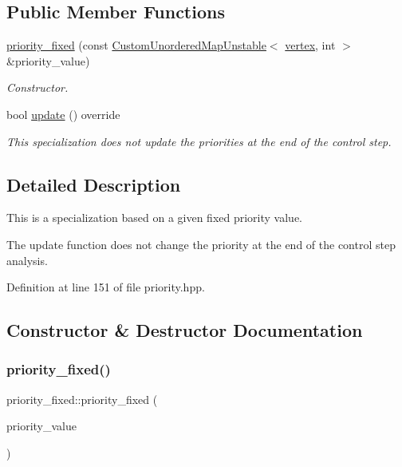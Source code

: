 \subsection*{Public Member Functions}
\begin{DoxyCompactItemize}
\item 
\hyperlink{structpriority__fixed_a5d59aa8f3a1e06e94a70e705db5f37f7}{priority\+\_\+fixed} (const \hyperlink{custom__map_8hpp_a8cbaceffc09790a885ec7e9c17809c69}{Custom\+Unordered\+Map\+Unstable}$<$ \hyperlink{graph_8hpp_abefdcf0544e601805af44eca032cca14}{vertex}, int $>$ \&priority\+\_\+value)
\begin{DoxyCompactList}\small\item\em Constructor. \end{DoxyCompactList}\item 
bool \hyperlink{structpriority__fixed_ad7f69dcb5974fda7d05af656dbaee1c7}{update} () override
\begin{DoxyCompactList}\small\item\em This specialization does not update the priorities at the end of the control step. \end{DoxyCompactList}\end{DoxyCompactItemize}


\subsection{Detailed Description}
This is a specialization based on a given fixed priority value. 

The update function does not change the priority at the end of the control step analysis. 

Definition at line 151 of file priority.\+hpp.



\subsection{Constructor \& Destructor Documentation}
\mbox{\label{structpriority__fixed_a5d59aa8f3a1e06e94a70e705db5f37f7}} 
\subsubsection{\texorpdfstring{priority\+\_\+fixed()}{priority\_fixed()}}
{\footnotesize\ttfamily priority\+\_\+fixed\+::priority\+\_\+fixed (\begin{DoxyParamCaption}\item[{const \hyperlink{custom__map_8hpp_a8cbaceffc09790a885ec7e9c17809c69}{Custom\+Unordered\+Map\+Unstable}$<$ \hyperlink{graph_8hpp_abefdcf0544e601805af44eca032cca14}{vertex}, int $>$ \&}]{priority\+\_\+value }\end{DoxyParamCaption})\hspace{0.3cm}{\ttfamily [explicit]}}



